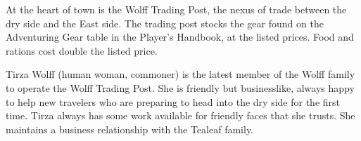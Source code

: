 At the heart of town is the Wolff Trading Post, the nexus of trade between the dry side and the East side.
The trading post stocks the gear found on the Adventuring Gear table in the Player's Handbook, at the listed prices.
Food and rations cost double the listed price.

Tirza Wolff (human woman, commoner) is the latest member of the Wolff family to operate the Wolff Trading Post.
She is friendly but businesslike, always happy to help new travelers who are preparing to head into the dry side for the first time.
Tirza always has some work available for friendly faces that she trusts.
She maintains a business relationship with the Tealeaf family.
